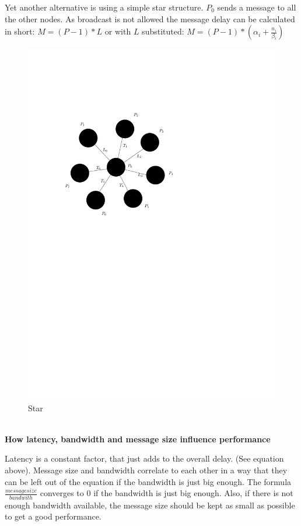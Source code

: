 \documentclass[a4paper,twoside,11pt]{article}
\begin{document}
Yet another alternative is using a simple star structure.
$P_0$ sends a message to all the other nodes.
As broadcast is not allowed the message delay can be calculated in short: $M = (P-1)*L$ or with $L$ substituted: $M = (P-1) * (\alpha_i + \frac{n_i}{\beta_i})$
\begin{figure}[!htbp]
    \begin{center}
        \includegraphics[scale=1]{3c_3.pdf}
    \end{center}
    \caption{Star}
    \label{Star}
\end{figure}



$ $ \\
\textbf{How latency, bandwidth and message size influence performance}

\hspace{1em}Latency is a constant factor, that just adds to the overall delay. (See equation above). Message size and bandwidth correlate to each other in a way that they can be left out of the equation if the bandwidth is just big enough.
The formula $\frac{messagesize}{bandwith}$ converges to 0 if the bandwidth is just big enough. Also, if there is not enough bandwidth available, the message size should be kept as small as possible to get a good performance.
\end{document}

